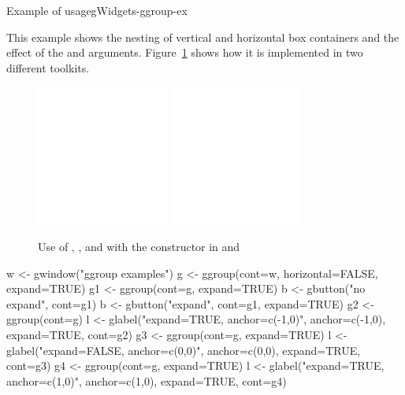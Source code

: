 \begin{example}{Example of  usage}{gWidgets-ggroup-ex}

This example shows the nesting of vertical and horizontal box containers and
the effect of the  and 
arguments. Figure~\ref{fig:ggroup-example} shows how it is implemented
in two different toolkits.
\begin{figure}
  \centering
  \includegraphics[width=.45\textwidth]{ex-gWidgets-ggroup-RGtk2}\quad
  \includegraphics[width=.45\textwidth]{ex-gWidgets-ggroup-tcltk}
 \caption{Use of , ,  and
      with the  constructor in  and }
  \label{fig:ggroup-example}
\end{figure}





\begin{Schunk}
\begin{Sinput}
 w  <- gwindow("ggroup examples")
 g  <- ggroup(cont=w, horizontal=FALSE, expand=TRUE)
 g1 <- ggroup(cont=g, expand=TRUE)
 b  <- gbutton("no expand", cont=g1)
 b  <- gbutton("expand", cont=g1, expand=TRUE)
 g2 <- ggroup(cont=g)
 l  <- glabel("expand=TRUE, anchor=c(-1,0)", anchor=c(-1,0), 
             expand=TRUE, cont=g2)
 g3 <- ggroup(cont=g, expand=TRUE)
 l  <- glabel("expand=FALSE, anchor=c(0,0)", anchor=c(0,0), 
             expand=TRUE, cont=g3)
 g4 <- ggroup(cont=g, expand=TRUE)
 l  <- glabel("expand=TRUE, anchor=c(1,0)", anchor=c(1,0), 
             expand=TRUE, cont=g4)
\end{Sinput}
\end{Schunk}
  


\end{example}
